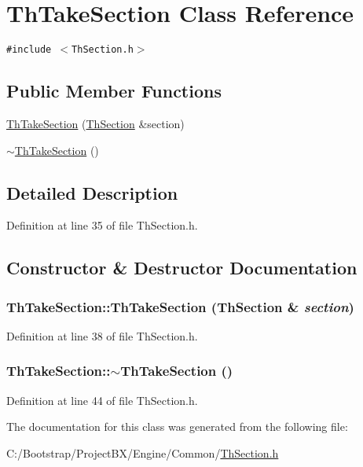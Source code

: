 \hypertarget{class_th_take_section}{
\section{ThTakeSection Class Reference}
\label{class_th_take_section}
}
{\tt \#include $<$ThSection.h$>$}

\subsection*{Public Member Functions}
\begin{CompactItemize}
\item 
\hyperlink{class_th_take_section_01531ff7919c30a762220c9af7e0c9e4}{ThTakeSection} (\hyperlink{class_th_section}{ThSection} \&section)
\item 
\hyperlink{class_th_take_section_8c30f01fc04ed47aea014e586406ad23}{$\sim$ThTakeSection} ()
\end{CompactItemize}


\subsection{Detailed Description}


Definition at line 35 of file ThSection.h.

\subsection{Constructor \& Destructor Documentation}
\hypertarget{class_th_take_section_01531ff7919c30a762220c9af7e0c9e4}{
\subsubsection[{ThTakeSection}]{\setlength{\rightskip}{0pt plus 5cm}ThTakeSection::ThTakeSection ({\bf ThSection} \& {\em section})}}
\label{class_th_take_section_01531ff7919c30a762220c9af7e0c9e4}




Definition at line 38 of file ThSection.h.\hypertarget{class_th_take_section_8c30f01fc04ed47aea014e586406ad23}{
\subsubsection[{$\sim$ThTakeSection}]{\setlength{\rightskip}{0pt plus 5cm}ThTakeSection::$\sim$ThTakeSection ()}}
\label{class_th_take_section_8c30f01fc04ed47aea014e586406ad23}




Definition at line 44 of file ThSection.h.

The documentation for this class was generated from the following file:\begin{CompactItemize}
\item 
C:/Bootstrap/ProjectBX/Engine/Common/\hyperlink{_th_section_8h}{ThSection.h}\end{CompactItemize}
